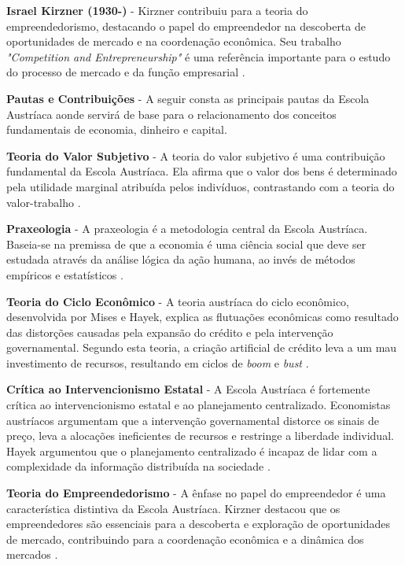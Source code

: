 \documentclass[article,12pt,oneside,a4paper,english,brazil]{unifil}
\begin{document}
\begin{Spacing}{1.5}
\textbf{Israel Kirzner (1930-)} - Kirzner contribuiu para a teoria do empreendedorismo, destacando o papel do empreendedor na descoberta de oportunidades de mercado e na coordenação econômica. Seu trabalho \textit{"Competition and Entrepreneurship"} é uma referência importante para o estudo do processo de mercado e da função empresarial \cite{kirzner1973competition}.

\textbf{Pautas e Contribuições} - A seguir consta as principais pautas da Escola Austríaca aonde servirá de base para o relacionamento dos conceitos fundamentais de economia, dinheiro e capital.

\textbf{Teoria do Valor Subjetivo} -
A teoria do valor subjetivo é uma contribuição fundamental da Escola Austríaca. Ela afirma que o valor dos bens é determinado pela utilidade marginal atribuída pelos indivíduos, contrastando com a teoria do valor-trabalho \cite{menger1871principles}.

\textbf{Praxeologia} -
A praxeologia é a metodologia central da Escola Austríaca. Baseia-se na premissa de que a economia é uma ciência social que deve ser estudada através da análise lógica da ação humana, ao invés de métodos empíricos e estatísticos \cite{mises1949human}.

\textbf{Teoria do Ciclo Econômico} -
A teoria austríaca do ciclo econômico, desenvolvida por Mises e Hayek, explica as flutuações econômicas como resultado das distorções causadas pela expansão do crédito e pela intervenção governamental. Segundo esta teoria, a criação artificial de crédito leva a um mau investimento de recursos, resultando em ciclos de \textit{boom} e \textit{bust} \cite{mises1949human,hayek1944road}.

\textbf{Crítica ao Intervencionismo Estatal} -
A Escola Austríaca é fortemente crítica ao intervencionismo estatal e ao planejamento centralizado. Economistas austríacos argumentam que a intervenção governamental distorce os sinais de preço, leva a alocações ineficientes de recursos e restringe a liberdade individual. Hayek argumentou que o planejamento centralizado é incapaz de lidar com a complexidade da informação distribuída na sociedade \cite{hayek1944road,hayek1960constitution}.

\textbf{Teoria do Empreendedorismo} -
A ênfase no papel do empreendedor é uma característica distintiva da Escola Austríaca. Kirzner destacou que os empreendedores são essenciais para a descoberta e exploração de oportunidades de mercado, contribuindo para a coordenação econômica e a dinâmica dos mercados \cite{kirzner1973competition}.


\end{Spacing}
\end{document}
